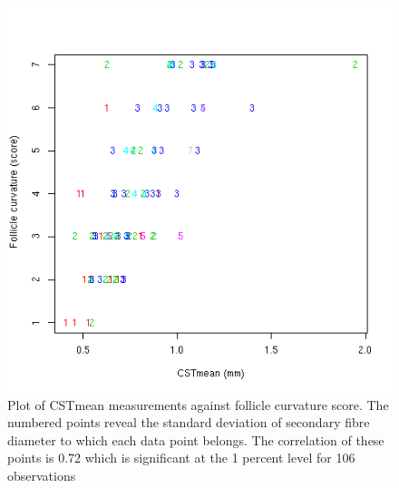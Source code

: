%

\begin{figure}[!h]
  \centering
  \includegraphics[width=1.0\textwidth]{CSTFcbyDsSD.png}
  \caption{Plot of CSTmean measurements against follicle curvature score. The numbered points reveal the standard deviation of secondary fibre diameter to which each data point belongs. The correlation of these points is 0.72 which is significant at the 1 percent level for 106 observations}
  \label{fig:CSTFcbyDsSD}
\end{figure}

%

